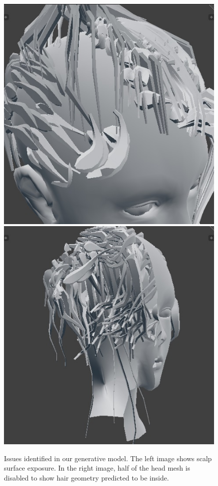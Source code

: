 \documentclass[ %
author={Dillon Keith Diep},
supervisor={Dr. Carl Henrik Ek},
degree={MEng},
title={ART-CG Hair:},
subtitle={Assisted Real-time Content Generation of Stylised Virtual Hair},
type={Research},
year={2017} ]{dissertation}
\begin{document}
\begin{figure}[!h]
	\centering
	\caption{Issues identified in our generative model. The left image shows scalp surface exposure. In the right image, half of the head mesh is disabled to show hair geometry predicted to be inside.}
	\includegraphics[scale=0.4]{images/baldHair}
	\includegraphics[scale=0.4]{images/intersectHair}
	\label{fig:genIssues}
\end{figure}
\end{document}
